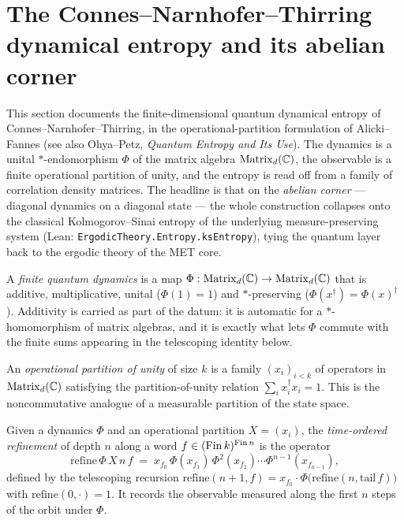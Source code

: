 \section{The Connes--Narnhofer--Thirring dynamical entropy and its abelian corner}
\label{sec:cnt}

This section documents the finite-dimensional quantum dynamical entropy of
Connes--Narnhofer--Thirring, in the operational-partition formulation of Alicki--Fannes (see also
Ohya--Petz, \emph{Quantum Entropy and Its Use}). The dynamics is a unital \(*\)-endomorphism
\(\Phi\) of the matrix algebra \(\operatorname{Matrix}_d(\mathbb{C})\), the observable is a finite operational
partition of unity, and the entropy is read off from a family of correlation density matrices. The
headline is that on the \emph{abelian corner} --- diagonal dynamics on a diagonal state --- the whole
construction collapses onto the classical Kolmogorov--Sinai entropy of the underlying
measure-preserving system (Lean: \texttt{ErgodicTheory.Entropy.ksEntropy}), tying the quantum layer back
to the ergodic theory of the MET core.

\begin{definition}\label{UnitalStarEndo}
  \leanok
  A \emph{finite quantum dynamics} is a map \(\Phi:\operatorname{Matrix}_d(\mathbb{C})\to\operatorname{Matrix}_d(\mathbb{C})\)
  that is additive, multiplicative, unital (\(\Phi(1)=1\)) and \(*\)-preserving
  (\(\Phi(x^{\dagger})=\Phi(x)^{\dagger}\)). Additivity is carried as part of the datum: it is
  automatic for a \(*\)-homomorphism of matrix algebras, and it is exactly what lets \(\Phi\) commute
  with the finite sums appearing in the telescoping identity below.
\end{definition}

\begin{definition}\label{OperationalPartition}
  \leanok
  An \emph{operational partition of unity} of size \(k\) is a family \((x_i)_{i<k}\) of operators in
  \(\operatorname{Matrix}_d(\mathbb{C})\) satisfying the partition-of-unity relation \(\sum_i x_i^{\dagger}x_i=1\).
  This is the noncommutative analogue of a measurable partition of the state space.
\end{definition}

\begin{definition}\label{refine}
  \leanok
  Given a dynamics \(\Phi\) and an operational partition \(X=(x_i)\), the \emph{time-ordered
  refinement} of depth \(n\) along a word \(f\in(\operatorname{Fin} k)^{\operatorname{Fin} n}\) is the operator
  \[
    \mathrm{refine}\,\Phi\,X\,n\,f \;=\;
      x_{f_0}\,\Phi(x_{f_1})\,\Phi^{2}(x_{f_2})\cdots\Phi^{n-1}(x_{f_{n-1}}),
  \]
  defined by the telescoping recursion
  \(\mathrm{refine}(n+1,f)=x_{f_0}\cdot\Phi\!\bigl(\mathrm{refine}(n,\mathrm{tail}\,f)\bigr)\) with
  \(\mathrm{refine}(0,\cdot)=1\). It records the observable measured along the first \(n\) steps of
  the orbit under \(\Phi\).
\end{definition}

